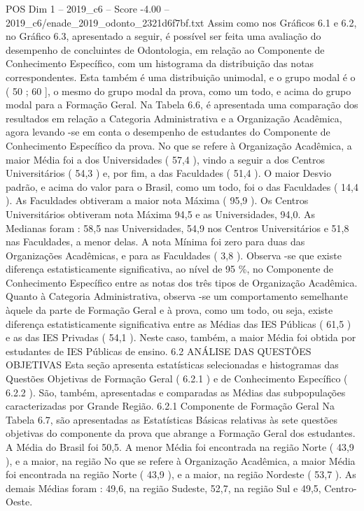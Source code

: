 \begin{textsample}{POS Dim 1 – 2019\_c6 – Score -4.00 – 2019\_c6/enade\_2019\_odonto\_2321d6f7bf.txt}
Assim como nos Gráficos 6.1 e 6.2, no Gráfico 6.3, apresentado a seguir, é possível ser feita uma avaliação do desempenho de concluintes de Odontologia, em relação ao Componente de Conhecimento Específico, com um histograma da distribuição das notas correspondentes.
Esta também é uma distribuição unimodal, e o grupo modal é o ( 50 ; 60 ], o mesmo do grupo modal da prova, como um todo, e acima do grupo modal para a Formação Geral.
Na Tabela 6.6, é apresentada uma comparação dos resultados em relação a Categoria Administrativa e a Organização Acadêmica, agora levando -se em conta o desempenho de estudantes do Componente de Conhecimento Específico da prova.
No que se refere à Organização Acadêmica, a maior Média foi a dos Universidades ( 57,4 ), vindo a seguir a dos Centros Universitários ( 54,3 ) e, por fim, a das Faculdades ( 51,4 ).
O maior Desvio padrão, e acima do valor para o Brasil, como um todo, foi o das Faculdades ( 14,4 ).
As Faculdades obtiveram a maior nota Máxima ( 95,9 ).
Os Centros Universitários obtiveram nota Máxima 94,5 e as Universidades, 94,0.
As Medianas foram : 58,5 nas Universidades, 54,9 nos Centros Universitários e 51,8 nas Faculdades, a menor delas.
A nota Mínima foi zero para duas das Organizações Acadêmicas, e para as Faculdades ( 3,8 ).
Observa -se que existe diferença estatisticamente significativa, ao nível de 95 \%, no Componente de Conhecimento Específico entre as notas dos três tipos de Organização Acadêmica.
Quanto à Categoria Administrativa, observa -se um comportamento semelhante àquele da parte de Formação Geral e à prova, como um todo, ou seja, existe diferença estatisticamente significativa entre as Médias das IES Públicas ( 61,5 ) e as das IES Privadas ( 54,1 ).
Neste caso, também, a maior Média foi obtida por estudantes de IES Públicas de ensino. 6.2 ANÁLISE DAS QUESTÕES OBJETIVAS Esta seção apresenta estatísticas selecionadas e histogramas das Questões Objetivas de Formação Geral ( 6.2.1 ) e de Conhecimento Específico ( 6.2.2 ).
São, também, apresentadas e comparadas as Médias das subpopulações caracterizadas por Grande Região. 6.2.1 Componente de Formação Geral Na Tabela 6.7, são apresentadas as Estatísticas Básicas relativas às sete questões objetivas do componente da prova que abrange a Formação Geral dos estudantes.
A Média do Brasil foi 50,5.
A menor Média foi encontrada na região Norte ( 43,9 ), e a maior, na região No que se refere à Organização Acadêmica, a maior Média foi encontrada na região Norte ( 43,9 ), e a maior, na região Nordeste ( 53,7 ).
As demais Médias foram : 49,6, na região Sudeste, 52,7, na região Sul e 49,5, Centro-Oeste.

\end{textsample}
